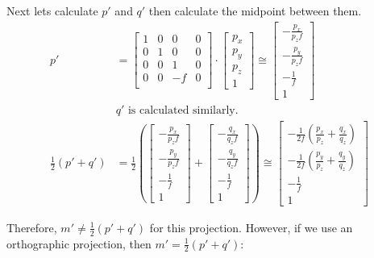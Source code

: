 \documentclass{article} %
\begin{document}
Next lets calculate $p'$ and $q'$ then calculate the midpoint between them.
\begin{align*}
p' &=
\left[
\begin{matrix}
1 & 0 & 0 & 0\\
0 & 1 & 0 & 0\\
0 & 0 & 1 & 0\\
0 & 0 & -f & 0\\
\end{matrix}
\right]
\cdot
\left[\begin{matrix}
p_x\\
p_y\\
p_z\\
1
\end{matrix}
\right]
\cong
\left[\begin{matrix}
-\frac{p_x}{p_z f}\\
-\frac{p_y}{p_z f}\\
-\frac{1}{f}\\
1
\end{matrix}
\right]\\
&\text{$q'$ is calculated similarly.}\\
\frac{1}{2}\left(p'+q'\right) &= 
\frac{1}{2}
\left(
\left[\begin{matrix}
-\frac{p_x}{p_z f}\\
-\frac{p_y}{p_z f}\\
-\frac{1}{f}\\
1
\end{matrix}
\right]
+
\left[\begin{matrix}
-\frac{q_x}{q_z f}\\
-\frac{q_y}{q_z f}\\
-\frac{1}{f}\\
1
\end{matrix}
\right]
\right)
\cong
\left[\begin{matrix}
-\frac{1}{2f}\left(\frac{p_x}{p_z} + \frac{q_x}{q_z}\right)\\
-\frac{1}{2f}\left(\frac{p_y}{p_z} + \frac{q_y}{q_z}\right)\\
-\frac{1}{f}\\
1
\end{matrix}
\right]
\end{align*}

Therefore, $m' \neq \frac{1}{2}(p'+q')$ for this projection. However, if we use an orthographic projection, then $m' = \frac{1}{2}(p'+q')$:
\end{document}
